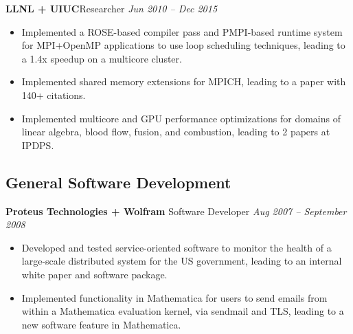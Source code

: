 \noindent
\textbf{LLNL + UIUC}\hfill {Researcher} \hfill \textit{Jun 2010 – Dec 2015}
\vspace*{-0.0in}
\begin{itemize}[itemsep=-0.1em]
\item Implemented a ROSE-based compiler pass and PMPI-based runtime system for MPI+OpenMP applications to use loop scheduling techniques, leading to a 1.4x speedup on a multicore cluster. 
\item Implemented shared memory extensions for MPICH, leading to a paper with 140+ citations.
\item Implemented multicore and GPU performance optimizations for domains of linear algebra, blood flow, fusion, and combustion, leading to 2 papers at IPDPS.

\end{itemize}


\subsection*{General Software Development}

\noindent
\textbf{Proteus Technologies + Wolfram} \hfill {Software Developer} \hfill \textit{Aug 2007 – September 2008}
\vspace*{-0.0in}
\begin{itemize}[itemsep=-0.1em]
\item Developed and tested service-oriented software to monitor the health of a large-scale distributed system for the US government, leading to an internal white paper and software package. 
\item Implemented functionality in Mathematica for users to send emails from within a Mathematica evaluation kernel, via sendmail and TLS, leading to a new software feature in Mathematica.

\end{itemize}
